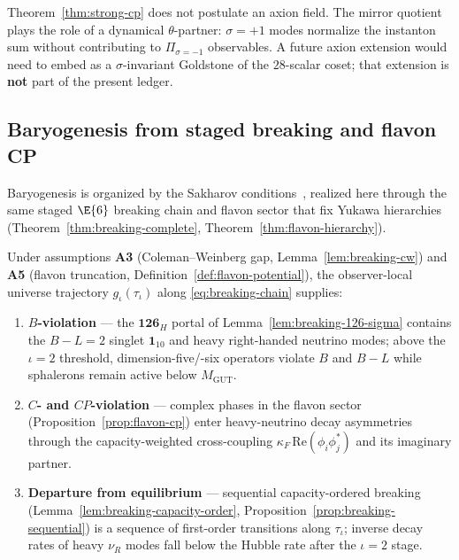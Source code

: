 \begin{remark}
Theorem~\ref{thm:strong-cp} does not postulate an axion field. The mirror
quotient plays the role of a dynamical $\theta$-partner: $\sigma=+1$ modes
normalize the instanton sum without contributing to $\Pi_{\sigma=-1}$
observables. A future axion extension would need to embed as a
$\sigma$-invariant Goldstone of the $28$-scalar coset; that extension is
\textbf{not} part of the present ledger.
\end{remark}

\subsection{Baryogenesis from staged breaking and flavon CP}
\label{sec:baryogenesis:sakharov}

Baryogenesis is organized by the Sakharov conditions~\cite{Sakharov1967},
realized here through the same staged $\E{6}$ breaking chain and flavon sector
that fix Yukawa hierarchies (Theorem~\ref{thm:breaking-complete},
Theorem~\ref{thm:flavon-hierarchy}).

\begin{lemma}
\label{lem:sakharov-conditions}
Under assumptions \textbf{A3} (Coleman--Weinberg gap,
Lemma~\ref{lem:breaking-cw}) and \textbf{A5} (flavon truncation,
Definition~\ref{def:flavon-potential}), the observer-local universe
trajectory $g_\iota(\tau_\iota)$ along \eqref{eq:breaking-chain} supplies:
\begin{enumerate}[label=\textbf{S\arabic* :},leftmargin=*]
  \item \label{sak:b} \textbf{$B$-violation} --- the $\mathbf{126}_H$ portal of
    Lemma~\ref{lem:breaking-126-sigma} contains the $B\!-\!L=2$ singlet
    $\mathbf{1}_{10}$ and heavy right-handed neutrino modes; above the
    $\iota=2$ threshold, dimension-five/-six operators violate $B$ and
    $B\!-\!L$ while sphalerons remain active below $M_{\mathrm{GUT}}$.
  \item \label{sak:cp} \textbf{$C$- and $CP$-violation} --- complex phases in
    the flavon sector (Proposition~\ref{prop:flavon-cp}) enter heavy-neutrino
    decay asymmetries through the capacity-weighted cross-coupling
    $\kappa_F\,\mathrm{Re}(\phi_i\phi_j^*)$ and its imaginary partner.
  \item \label{sak:neq} \textbf{Departure from equilibrium} --- sequential
    capacity-ordered breaking
    (Lemma~\ref{lem:breaking-capacity-order},
    Proposition~\ref{prop:breaking-sequential}) is a sequence of first-order
    transitions along $\tau_\iota$; inverse decay rates of heavy $\nu_R$ modes
    fall below the Hubble rate after the $\iota=2$ stage.
\end{enumerate}
\end{lemma}

